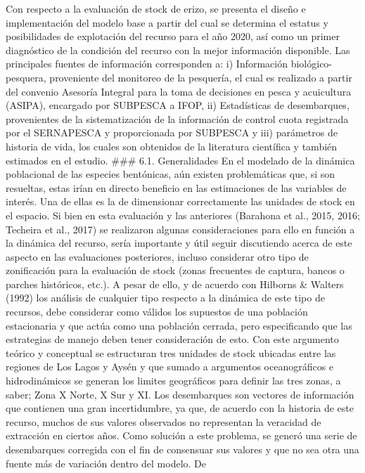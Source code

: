 \documentclass[
]{article}
\begin{document}
Con respecto a la evaluación de stock de erizo, se presenta el diseño e
implementación del modelo base a partir del cual se determina el estatus
y posibilidades de explotación del recurso para el año 2020, así como un
primer diagnóstico de la condición del recurso con la mejor información
disponible. Las principales fuentes de información corresponden a: i)
Información biológico-pesquera, proveniente del monitoreo de la
pesquería, el cual es realizado a partir del convenio Asesoría Integral
para la toma de decisiones en pesca y acuicultura (ASIPA), encargado por
SUBPESCA a IFOP, ii) Estadísticas de desembarques, provenientes de la
sistematización de la información de control cuota registrada por el
SERNAPESCA y proporcionada por SUBPESCA y iii) parámetros de historia de
vida, los cuales son obtenidos de la literatura científica y también
estimados en el estudio. \#\#\# 6.1. Generalidades En el modelado de la
dinámica poblacional de las especies bentónicas, aún existen
problemáticas que, si son resueltas, estas irían en directo beneficio en
las estimaciones de las variables de interés. Una de ellas es la de
dimensionar correctamente las unidades de stock en el espacio. Si bien
en esta evaluación y las anteriores (Barahona et al., 2015, 2016;
Techeira et al., 2017) se realizaron algunas consideraciones para ello
en función a la dinámica del recurso, sería importante y útil seguir
discutiendo acerca de este aspecto en las evaluaciones posteriores,
incluso considerar otro tipo de zonificación para la evaluación de stock
(zonas frecuentes de captura, bancos o parches históricos, etc.). A
pesar de ello, y de acuerdo con Hilborns \& Walters (1992) los análisis
de cualquier tipo respecto a la dinámica de este tipo de recursos, debe
considerar como válidos los supuestos de una población estacionaria y
que actúa como una población cerrada, pero especificando que las
estrategias de manejo deben tener consideración de esto. Con este
argumento teórico y conceptual se estructuran tres unidades de stock
ubicadas entre las regiones de Los Lagos y Aysén y que sumado a
argumentos oceanográficos e hidrodinámicos se generan los limites
geográficos para definir las tres zonas, a saber; Zona X Norte, X Sur y
XI. Los desembarques son vectores de información que contienen una gran
incertidumbre, ya que, de acuerdo con la historia de este recurso,
muchos de sus valores observados no representan la veracidad de
extracción en ciertos años. Como solución a este problema, se generó una
serie de desembarques corregida con el fin de consensuar sus valores y
que no sea otra una fuente más de variación dentro del modelo. De
\end{document}
